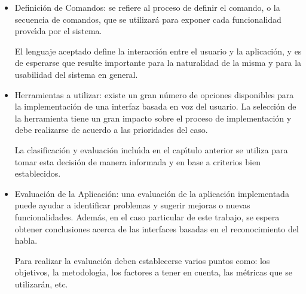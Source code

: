 \begin{itemize}
    \item Definici\'on de Comandos: se refiere al proceso de definir el comando, o la secuencia de
    comandos, que se utilizar\'a para exponer cada funcionalidad prove{\'\i}da por el sistema.

    El lenguaje aceptado define la interacci\'on entre el usuario y la aplicaci\'on, y es de esperarse
    que resulte importante para la naturalidad de la misma y para la usabilidad del sistema en
    general.

    \item Herramientas a utilizar: existe un gran n\'umero de opciones disponibles
    para la implementaci\'on de una interfaz basada en voz del usuario.
    La selecci\'on de la herramienta tiene un gran impacto sobre el proceso de implementaci\'on
    y debe realizarse de acuerdo a las prioridades del caso.

    La clasificaci\'on y evaluaci\'on inclu{\'\i}da en el cap{\'\i}tulo anterior se utiliza 
    para tomar esta decisi\'on de manera informada y en base a criterios bien establecidos.

    \item Evaluaci\'on de la Aplicaci\'on: una evaluaci\'on de la aplicaci\'on implementada puede ayudar
    a identificar problemas y sugerir mejoras o nuevas funcionalidades. Adem\'as, en el caso particular
    de este trabajo, se espera obtener conclusiones acerca de las interfaces basadas en el reconocimiento
    del habla.

    Para realizar la evaluaci\'on deben establecerse varios puntos como: los objetivos, la metodolog{\'\i}a,
    los factores a tener en cuenta, las m\'etricas que se utilizar\'an, etc.

 \end{itemize} 